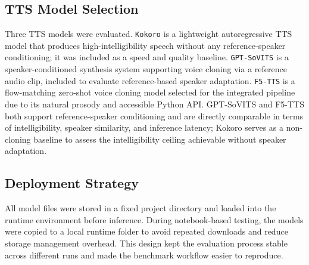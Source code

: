 \documentclass[12pt, a4paper]{article}
\begin{document}
\subsection{TTS Model Selection}

Three TTS models were evaluated. \texttt{Kokoro} is a lightweight autoregressive TTS model that produces high-intelligibility speech without any reference-speaker conditioning; it was included as a speed and quality baseline. \texttt{GPT-SoVITS} is a speaker-conditioned synthesis system supporting voice cloning via a reference audio clip, included to evaluate reference-based speaker adaptation. \texttt{F5-TTS} is a flow-matching zero-shot voice cloning model selected for the integrated pipeline due to its natural prosody and accessible Python API. GPT-SoVITS and F5-TTS both support reference-speaker conditioning and are directly comparable in terms of intelligibility, speaker similarity, and inference latency; Kokoro serves as a non-cloning baseline to assess the intelligibility ceiling achievable without speaker adaptation.

\subsection{Deployment Strategy}

All model files were stored in a fixed project directory and loaded into the runtime environment before inference. During notebook-based testing, the models were copied to a local runtime folder to avoid repeated downloads and reduce storage management overhead. This design kept the evaluation process stable across different runs and made the benchmark workflow easier to reproduce.

\end{document}
